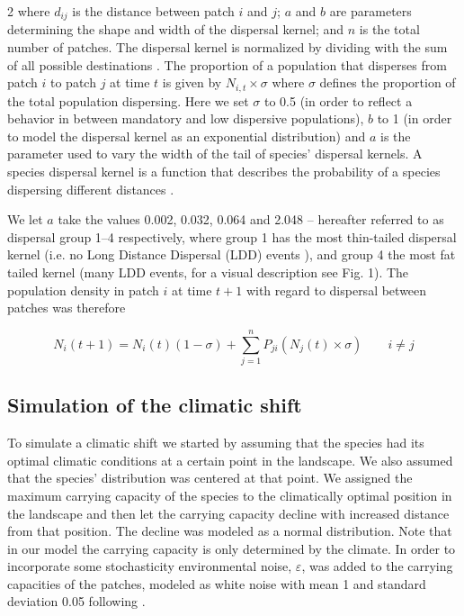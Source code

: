 \documentclass[12pt,pdftex]{article}
\begin{document}
\begin{spacing}{2}
where $d_{ij}$ is the distance between patch $i$ and $j$; $a$ and $b$ are parameters determining the shape and width of the dispersal kernel; and $n$ is the total number of patches. The dispersal kernel is normalized by dividing with the sum of all possible destinations \citep{Lindstrom2009}. The proportion of a population that disperses from patch $i$ to patch $j$ at time $t$ is given by $N_{i,t} \times \sigma$ where $\sigma$ defines the proportion of the total population dispersing. Here we set $\sigma$ to 0.5 (in order to reflect a behavior in between mandatory and low dispersive populations), $b$ to 1 (in order to model the dispersal kernel as an exponential distribution) and $a$ is the parameter used to vary the width of the tail of species' dispersal kernels. A species dispersal kernel is a function that describes the probability of a species dispersing different distances \citep{Nathan2006}.

 We let $a$ take the values 0.002, 0.032, 0.064 and 2.048 -- hereafter referred to as dispersal group 1--4 respectively, where group 1 has the most thin-tailed dispersal kernel (i.e. no Long Distance Dispersal (LDD) events \citep{Nathan2006, Hovestadt2001}), and group 4 the most fat tailed kernel (many LDD events, for a visual description see Fig. 1).  The population density in patch $i$ at time $t+1$ with regard to dispersal between patches was therefore 

\begin{equation}
	N_{i}(t+1)=N_{i}(t)  (1- \sigma)  + \sum_{j=1}^{n}P_{ji}(N_{j}(t) \times \sigma) \qquad i\neq j
\end{equation}


\subsection*{Simulation of the climatic shift} 
To simulate a climatic shift we started by assuming that the species had its optimal climatic conditions at a certain point in the landscape. We also assumed that the species’ distribution was centered at that point. We assigned the maximum carrying capacity of the species to the climatically optimal position in the landscape and then let the carrying capacity decline with increased distance from that position. The decline was modeled as a normal distribution.  Note that in our model the carrying capacity is only determined by the climate. In order to incorporate some stochasticity environmental noise, $\varepsilon$, was added to the carrying capacities of the patches, modeled as white noise with mean 1 and standard deviation 0.05 following \cite{Logdberg2012}.


\end{spacing}
\end{document}
